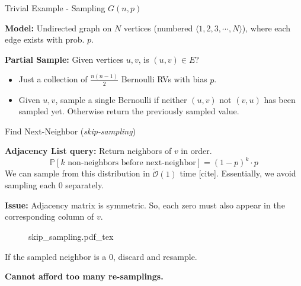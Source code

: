 \begin{block}{Trivial Example - Sampling $G(n, p)$}

\textbf{Model:} Undirected graph on $N$ vertices (numbered $\langle 1, 2, 3, \cdots, N\rangle$),
where each edge exists with prob. $p$.

\textbf{Partial Sample:} Given vertices $u, v$, is $(u,v)\in E$?

\begin{itemize}
    \item Just a collection of $\frac{n(n-1)}{2}$ Bernoulli RVs with bias $p$.
    \item Given $u, v$, sample a single Bernoulli if neither $(u,v)$ not $(v,u)$ has been sampled yet.
          Otherwise return the previously sampled value.
\end{itemize}

\end{block}

\begin{block}{Find Next-Neighbor (\emph{skip-sampling})}

\textbf{Adjacency List query:} Return neighbors of $v$ in order.
$$
\mathbb P[k \textrm{ non-neighbors before next-neighbor}] = (1-p)^k\cdot p
$$
We can sample from this distribution in $\tilde{\mathcal O}(1)$ time [cite].
Essentially, we avoid sampling each $0$ separately.

\textbf{Issue:} Adjacency matrix is symmetric. So, each zero must also appear in the corresponding column of $v$.
\begin{figure}[h!]\centering
    \def\svgwidth{1.0\columnwidth}
    {skip_sampling.pdf_tex}
\end{figure}
If the sampled neighbor is a $0$, discard and resample.

\textbf{Cannot afford too many re-samplings.}

\end{block}
